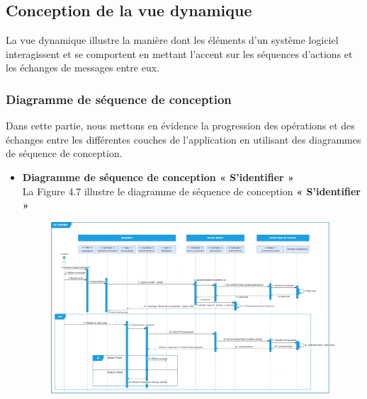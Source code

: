 \subsection{Conception de la vue dynamique}
La vue dynamique illustre la manière dont les éléments d'un système logiciel interagissent et se comportent en mettant l'accent sur les séquences d'actions et les échanges de messages entre eux.

\subsubsection{Diagramme de séquence de conception}
\justifying
Dans cette partie, nous mettons en évidence la progression des opérations et des échanges entre les différentes couches de l'application en utilisant des diagrammes de séquence de conception.
\begin{itemize}[itemsep=1pt, parsep=1pt]
    \newpage
    \item \textbf{Diagramme de séquence de conception « S’identifier » }\\
        La Figure 4.7 illustre le diagramme de séquence de conception \textbf{« S’identifier »} 
        \begin{figure}[H]
            \centering
            \includegraphics[width=1.32\textwidth,height=1\textwidth,angle=90]{images/chp4/fig7.png}

\end{figure}
\end{itemize}

